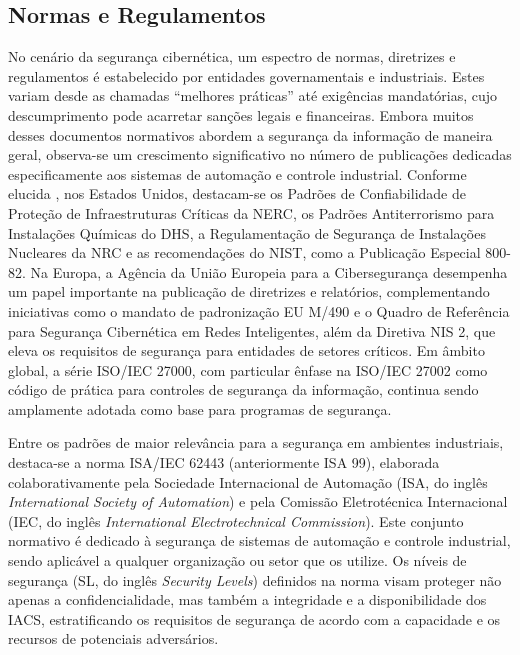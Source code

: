     \subsection{Normas e Regulamentos} \label{subsec:normasEregulamentos}

        No cenário da segurança cibernética, um espectro de normas, diretrizes e regulamentos é estabelecido por entidades governamentais e industriais. Estes variam desde as chamadas ``melhores práticas'' até exigências mandatórias, cujo descumprimento pode acarretar sanções legais e financeiras. Embora muitos desses documentos normativos abordem a segurança da informação de maneira geral, observa-se um crescimento significativo no número de publicações dedicadas especificamente aos sistemas de automação e controle industrial. Conforme elucida , nos Estados Unidos, destacam-se os Padrões de Confiabilidade de Proteção de Infraestruturas Críticas da NERC, os Padrões Antiterrorismo para Instalações Químicas do DHS, a Regulamentação de Segurança de Instalações Nucleares da NRC e as recomendações do NIST, como a Publicação Especial 800-82. Na Europa, a Agência da União Europeia para a Cibersegurança desempenha um papel importante na publicação de diretrizes e relatórios, complementando iniciativas como o mandato de padronização EU M/490 e o Quadro de Referência para Segurança Cibernética em Redes Inteligentes, além da Diretiva NIS 2, que eleva os requisitos de segurança para entidades de setores críticos. Em âmbito global, a série ISO/IEC 27000, com particular ênfase na ISO/IEC 27002 como código de prática para controles de segurança da informação, continua sendo amplamente adotada como base para programas de segurança.
        
        Entre os padrões de maior relevância para a segurança em ambientes industriais, destaca-se a norma ISA/IEC 62443 (anteriormente ISA 99), elaborada colaborativamente pela Sociedade Internacional de Automação (ISA, do inglês \textit{International Society of Automation}) e pela Comissão Eletrotécnica Internacional (IEC, do inglês \textit{International Electrotechnical Commission}). Este conjunto normativo é dedicado à segurança de sistemas de automação e controle industrial, sendo aplicável a qualquer organização ou setor que os utilize. Os níveis de segurança (SL, do inglês \textit{Security Levels}) definidos na norma visam proteger não apenas a confidencialidade, mas também a integridade e a disponibilidade dos IACS, estratificando os requisitos de segurança de acordo com a capacidade e os recursos de potenciais adversários.

